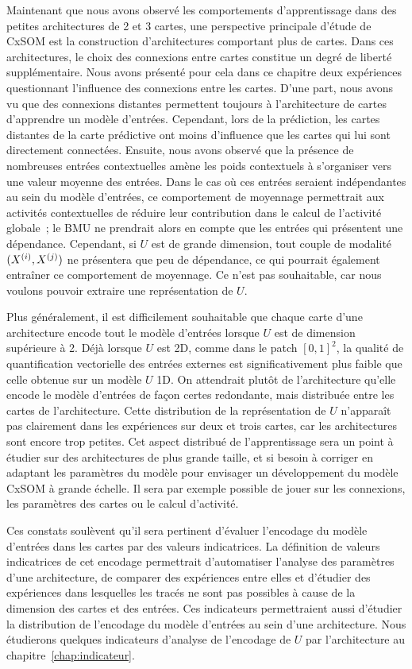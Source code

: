 \documentclass[../main]{subfiles}
\begin{document}
Maintenant que nous avons observé les comportements d'apprentissage dans des petites architectures de 2 et 3 cartes, une perspective principale d'étude de CxSOM est la construction d'architectures comportant plus de cartes.
Dans ces architectures, le choix des connexions entre cartes constitue un degré de liberté supplémentaire.
Nous avons présenté pour cela dans ce chapitre deux expériences questionnant l'influence des connexions entre les cartes.
D'une part, nous avons vu que des connexions distantes permettent toujours à l'architecture de cartes d'apprendre un modèle d'entrées. Cependant, lors de la prédiction, les cartes distantes de la carte prédictive ont moins d'influence que les cartes qui lui sont directement connectées.
Ensuite, nous avons observé que la présence de nombreuses entrées contextuelles amène les poids contextuels à s'organiser vers une valeur moyenne des entrées. Dans le cas où ces entrées seraient indépendantes au sein du modèle d'entrées, ce comportement de moyennage permettrait aux activités contextuelles de réduire leur contribution dans le calcul de l'activité globale~; le BMU ne prendrait alors en compte que les entrées qui présentent une dépendance.
Cependant, si $U$ est de grande dimension, tout couple de modalité $(X^{({i})}, X^{({j})})$ ne présentera que peu de dépendance, ce qui pourrait également entraîner ce comportement de moyennage. Ce n'est pas souhaitable, car nous voulons pouvoir extraire une représentation de $U$. 

Plus généralement, il est difficilement souhaitable que chaque carte d'une architecture encode tout le modèle d'entrées lorsque $U$ est de dimension supérieure à 2.
Déjà lorsque $U$ est 2D, comme dans le patch $[0,1]^2$, la qualité de quantification vectorielle des entrées externes est significativement plus faible que celle obtenue sur un modèle $U$ 1D.
On attendrait plutôt de l'architecture qu'elle encode le modèle d'entrées de façon certes redondante, mais distribuée entre les cartes de l'architecture.
Cette distribution de la représentation de $U$ n'apparaît pas clairement dans les expériences sur deux et trois cartes, car les architectures sont encore trop petites. 
Cet aspect distribué de l'apprentissage sera un point à étudier sur des architectures de plus grande taille, et si besoin à corriger en adaptant les paramètres du modèle pour envisager un développement du modèle CxSOM à grande échelle. 
Il sera par exemple possible de jouer sur les connexions, les paramètres des cartes ou le calcul d'activité.

Ces constats soulèvent qu'il sera pertinent d'évaluer l'encodage du modèle d'entrées dans les cartes par des valeurs indicatrices.
La définition de valeurs indicatrices de cet encodage permettrait d'automatiser l'analyse des paramètres d'une architecture, de comparer des expériences entre elles et d'étudier des expériences dans lesquelles les tracés ne sont pas possibles à cause de la dimension des cartes et des entrées.
Ces indicateurs permettraient aussi d'étudier la distribution de l'encodage du modèle d'entrées au sein d'une architecture.
Nous étudierons quelques indicateurs d'analyse de l'encodage de $U$ par l'architecture au chapitre~\ref{chap:indicateur}.
\end{document}
